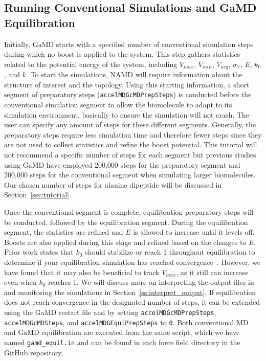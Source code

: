 \documentclass[9pt,tutorial]{livecoms}
\begin{document}
\subsection{Running Conventional Simulations and GaMD Equilibration} \label{ss:cmd_gamd_equil}
Initially, GaMD starts with a specified number of conventional simulation steps during which no boost is applied to the system. This step gathers statistics related to the potential energy of the system, including $V_{max}$, $V_{min}$, $V_{avg}$, $\sigma_{V}$, $E$, $k_{0}$, and $k$. To start the simulations, NAMD will require information about the structure of interest and the topology. Using this starting information, a short segment of preparatory steps (\texttt{accelMDGcMDPrepSteps}) is conducted before the conventional simulation segment to allow the biomolecule to adapt to its simulation environment, basically to ensure the simulation will not crash. The user can specify any amount of steps for these different segments. Generally, the preparatory steps require less simulation time and therefore fewer steps since they are not used to collect statistics and refine the boost potential. This tutorial will not recommend a specific number of steps for each segment but previous studies using GaMD have employed 200,000 steps for the preparatory segment and 200,000 steps for the conventional segment when simulating larger biomolecules. Our chosen number of steps for alanine dipeptide will be discussed in Section~\ref{sec:tutorial}.

Once the conventional segment is complete, equilibration preparatory steps will be conducted, followed by the equilibration segment. During the equilibration segment, the statistics are refined and $E$ is allowed to increase until it levels off. Boosts are also applied during this stage and refined based on the changes to $E$. Prior work states that $k_{0}$ should stabilize or reach 1 throughout equilibration to determine if your equilibration simulation has reached convergence~\cite{miao_gaussian_2015}. However, we have found that it may also be beneficial to track $V_{max}$, as it still can increase even when $k_{0}$ reaches 1. We will discuss more on interpreting the output files in and monitoring the simulations in Section~\ref{ss:interpret_output}. If equilibration does not reach convergence in the designated number of steps, it can be extended using the GaMD restart file and by setting \texttt{accelMDGcMDPrepSteps}, \texttt{accelMDGcMDSteps}, and \texttt{accelMDGEquiPrepSteps} to \texttt{0}. Both conventional MD and GaMD equilibration are executed from the same script, which we have named \texttt{gamd\_equil.in} and can be found in each force field directory in the GitHub repository.
\end{document}
